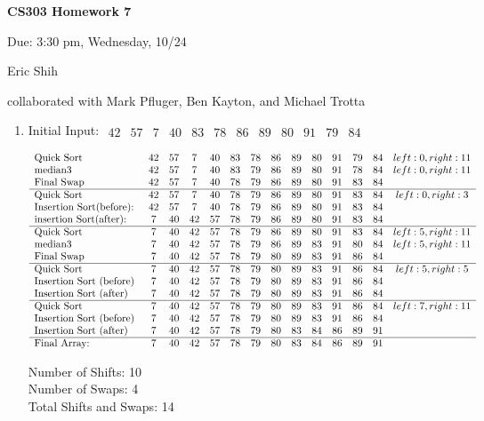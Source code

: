 \documentclass[10pt]{article}
\begin{document}
\begin{LARGE}
\centerline {\bf CS303 Homework 7}
\end{LARGE}
\vskip 0.25cm

\centerline{Due: 3:30 pm, Wednesday, 10/24}
\centerline{Eric Shih}
\centerline{collaborated with Mark Pfluger, Ben Kayton, and Michael Trotta}

\begin{enumerate}
 \item Initial Input: 
$
\begin{array}{cccccccccccc}
42 & 57 & 7 & 40 & 83 & 78 & 86 & 89 & 80 & 91 & 79 & 84
\end{array}
$


\[
\begin{array}{lccccccccccccc}
$Quick Sort$ & 42& 57& 7& 40& 83& 78& 86& 89& 80& 91& 79& 84 & left: 0, right: 11\\
$median3$& 42& 57& 7& 40& 83& 79& 86& 89& 80& 91& 78& 84 & left: 0, right: 11\\
$Final Swap$& 42& 57& 7& 40& 78& 79& 86& 89& 80& 91& 83& 84 \\ \hline
$Quick Sort$ & 42& 57& 7& 40& 78& 79& 86& 89& 80& 91& 83& 84 &  left: 0, right: 3\\
$Insertion Sort(before): $&42& 57& 7& 40& 78& 79& 86& 89& 80& 91& 83& 84 \\
$insertion Sort(after): $&7& 40& 42& 57& 78& 79& 86& 89& 80& 91& 83& 84 \\ \hline
$Quick Sort$ & 7& 40& 42& 57& 78& 79& 86& 89& 80& 91& 83& 84 &  left: 5, right: 11\\
$median3$& 7& 40& 42& 57& 78& 79& 86& 89& 83& 91& 80& 84 & left: 5, right: 11 \\
$Final Swap$&7& 40& 42& 57& 78& 79& 80& 89& 83& 91& 86& 84 \\ \hline
$Quick Sort$ & 7& 40& 42& 57& 78& 79& 80& 89& 83& 91& 86& 84 & left: 5, right: 5\\
$Insertion Sort (before)$&7& 40& 42& 57& 78& 79& 80& 89& 83& 91& 86& 84 \\
$Insertion Sort (after)$&7& 40& 42& 57& 78& 79& 80& 89& 83& 91& 86& 84 \\ \hline
$Quick Sort$ & 7& 40& 42& 57& 78& 79& 80& 89& 83& 91& 86& 84 & left: 7, right: 11\\
$Insertion Sort (before)$& 7& 40& 42& 57& 78& 79& 80& 89& 83& 91& 86& 84 \\
$Insertion Sort (after)$& 7& 40& 42& 57& 78& 79& 80& 83& 84& 86& 89& 91 \\ \hline
$Final Array:$& 7& 40& 42& 57& 78& 79& 80& 83& 84& 86& 89& 91
\end{array}
\]
\centerline{ Number of Shifts: 10\\
Number of Swaps: 4\\
Total Shifts and Swaps: 14}


\end{enumerate}
\end{document}
